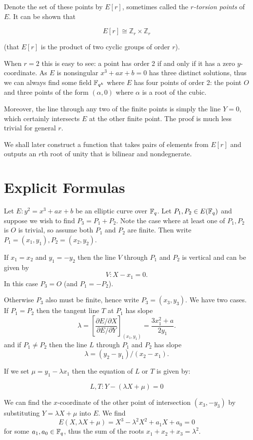 Denote the set of these points by $E[r]$, sometimes called the
\emph{$r$-torsion points} of $E$. It can be shown that

\[ E[r] \cong \mathbb{Z}_r \times \mathbb{Z}_r \]

(that $E[r]$ is the product of two cyclic groups of order $r$).

When $r=2$ this is easy to see: a point has order 2 if and only if it has
a zero $y$-coordinate. As $E$ is nonsingular
$x^3 + ax + b = 0$ has three distinct solutions, thus we can always find
some field $\mathbb{F}_{q^k}$ where $E$ has
four points of order 2: the point $O$ and three points of the form
$(\alpha, 0)$ where $\alpha$ is a root of the cubic.

Moreover,
the line through any two of the finite points is simply the line $Y = 0$,
which certainly intersects $E$ at the other finite point.
The proof is much less trivial for general $r$.

We shall later construct a function
that takes pairs of elements from $E[r]$ and outputs an $r$th root of unity
that is bilinear and nondegnerate.

\section {Explicit Formulas}

Let $E: y^2 = x^3 + ax + b$ be an elliptic curve over $\mathbb{F}_q$. Let
$P_1, P_2 \in E(\mathbb{F}_q)$ and suppose
we wish to find $P_3 = P_1 + P_2$.
Note the case where at least one of $P_1, P_2$ is $O$ is trivial,
so assume both $P_1$ and $P_2$ are finite.
Then write $P_1 = (x_1, y_1), P_2 = (x_2, y_2)$.

If $x_1 = x_2$ and $y_1 = -y_2$
then the line $V$ through $P_1$ and $P_2$ is vertical and
can be given by
\[ V : X - x_1 = 0  . \]
In this case $P_3 = O$ (and $P_1 = -P_2$).

Otherwise $P_3$ also must be finite, hence write $P_3 = (x_3, y_3)$.
We have two cases. If $P_1 = P_2$ then the tangent line $T$ at
$P_1$
has slope
\[\lambda =
\left[ \frac{\partial E / \partial X}{\partial E/ \partial Y} \right]_{(x_1,y_1)}
= \frac{3x_1^2 + a}{2y_1} . \]
and if $P_1 \ne P_2$ then the line $L$ through $P_1$ and $P_2$ has slope
\[ \lambda = (y_2 - y_1)/(x_2 - x_1) . \]

If we set $\mu = y_1 - \lambda x_1$ then
the equation of $L$ or $T$ is given by:

\[ L, T :  Y - (\lambda X + \mu) = 0 \]

We can find the $x$-coordinate of the other point of intersection $(x_3, -y_3)$
by substituting $Y = \lambda X + \mu$ into $E$. We find
\[ E(X, \lambda X+\mu) = X^3 - \lambda^2 X^2 + a_1 X + a_0 = 0 \]
for some $a_1, a_0 \in \mathbb{F}_q$, thus the sum of the roots
$x_1 + x_2 + x_3 = \lambda^2$.

